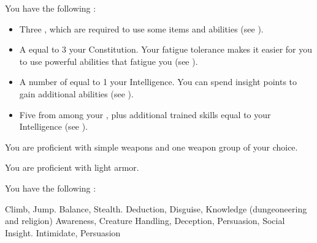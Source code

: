          You have the following :
        \begin{itemize}
            \item Three , which are required to use some items and abilities (see ).
            \item A  equal to 3 \add your Constitution.
                Your fatigue tolerance makes it easier for you to use powerful abilities that fatigue you (see ).
            \item A number of  equal to 1 \add your Intelligence.
                You can spend insight points to gain additional abilities (see ).
            \item Five  from among your , plus additional trained skills equal to your Intelligence (see ).
        \end{itemize}

        You are proficient with simple weapons and one weapon group of your choice.

        You are proficient with light armor.

        You have the following :
        \begin{itemize}
             Climb, Jump.
             Balance, Stealth.
             Deduction, Disguise, Knowledge (dungeoneering and religion)
             Awareness, Creature Handling, Deception, Persuasion, Social Insight.
             Intimidate, Persuasion
        \end{itemize}
